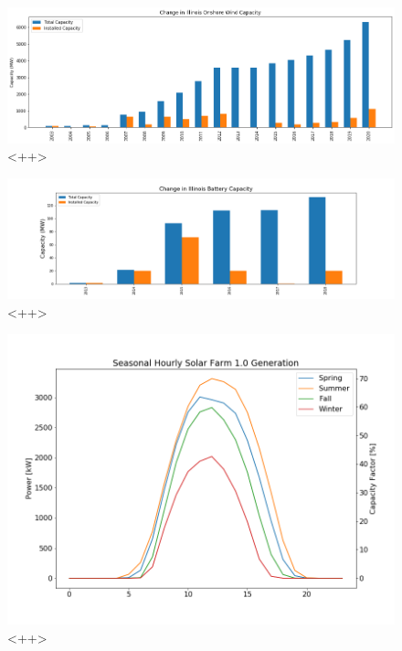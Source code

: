\begin{figure}[H]
	\centering
	\includegraphics[width=\columnwidth]{./img/annual_installed_cap_utilitywind.png}
        \caption{<++>}
	\label{fig:<++>}
\end{figure}



\begin{figure}[H]
	\centering
        \includegraphics[width=\columnwidth]{./img/cap/battery.png}
	\caption{<++>}
	\label{fig:<++>}
\end{figure}

\begin{figure}[H]
	\centering
	\includegraphics[width=\columnwidth]{./img/cap/seasonal_hourly_solar.png}
	\caption{<++>}
	\label{fig:<++>}
\end{figure}

